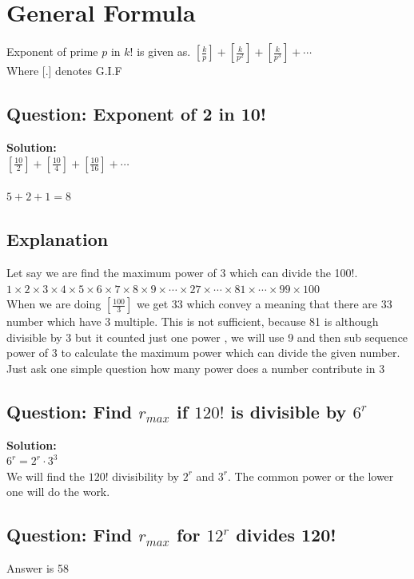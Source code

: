 \section*{General Formula}
Exponent of prime $p$ in $k!$ is given as.
$\left[\frac{k}{p}\right]+\left[\frac{k}{p^2}\right]+\left[\frac{k}{p^3}\right]+\cdots$ \\
Where [.] denotes G.I.F

\subsection*{Question: Exponent of 2 in 10!}
\textbf{Solution: }\\
$\left[\frac{10}{2}\right]+\left[\frac{10}{4}\right]+\left[\frac{10}{16}\right]+\cdots$ \\ \\
$5+2+1 = 8$

\subsection*{Explanation}
Let say we are find the maximum power of 3 which can divide the 100!. \\
$1 \times2 \times3 \times4 \times5 \times6 \times7 \times8 \times9 \times \cdots \times27 \times \cdots \times 81\times \cdots \times99 \times100 $ \\
When we are doing $\left[\frac{100}{3}\right]$ we get 33 which convey a meaning that there are 33 number which have 3 multiple. This is not sufficient, because 81 is although divisible by 3 but it counted just one power , we will use 9  and then sub sequence power of 3 to calculate the maximum power which can divide the given number. Just ask one simple question how many power does a number contribute in 3

\subsection*{Question: Find $r_{max}$ if $120!$ is  divisible by $6^r$}
\textbf{Solution: }
\\
$6^r = 2^r\cdot 3^3$\\
We will find the $120!$ divisibility by $2^r$ and $3^r$. The common power or the lower one will do the work.

\subsection*{Question: Find $r_{max}$ for $12^r$ divides 120!}
Answer is 58

